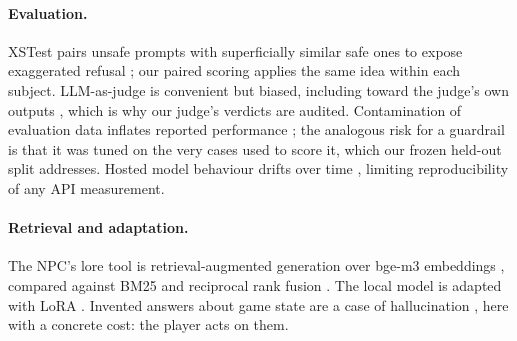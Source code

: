 \paragraph{Evaluation.} XSTest pairs unsafe prompts with superficially similar
safe ones to expose exaggerated refusal \cite{rottger2024xstest}; our paired
scoring applies the same idea within each subject. LLM-as-judge is convenient
but biased, including toward the judge's own outputs
\cite{zheng2023judging,panickssery2024selfpref}, which is why our judge's
verdicts are audited. Contamination of evaluation data inflates reported
performance \cite{sainz2023contamination}; the analogous risk for a guardrail
is that it was tuned on the very cases used to score it, which our frozen
held-out split addresses. Hosted model behaviour drifts over time
\cite{chen2024chatgptdrift}, limiting reproducibility of any API measurement.

\paragraph{Retrieval and adaptation.} The NPC's lore tool is
retrieval-augmented generation \cite{lewis2020rag} over bge-m3 embeddings
\cite{chen2024bgem3}, compared against BM25 \cite{robertson2009bm25} and
reciprocal rank fusion \cite{cormack2009rrf}. The local model is adapted with
LoRA \cite{hu2022lora}. Invented answers about game state are a case of
hallucination \cite{ji2023hallucination}, here with a concrete cost: the
player acts on them.
